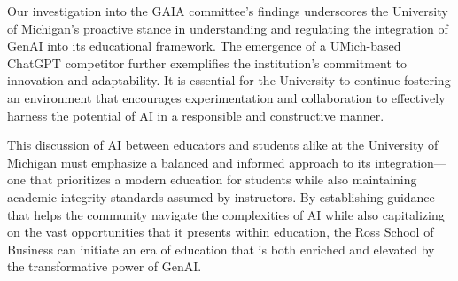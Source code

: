 \documentclass[
]{book}
\begin{document}
Our investigation into the GAIA committee's findings underscores the University of Michigan's proactive stance in understanding and regulating the integration of GenAI into its educational framework. The emergence of a UMich-based ChatGPT competitor further exemplifies the institution's commitment to innovation and adaptability. It is essential for the University to continue fostering an environment that encourages experimentation and collaboration to effectively harness the potential of AI in a responsible and constructive manner.

This discussion of AI between educators and students alike at the University of Michigan must emphasize a balanced and informed approach to its integration---one that prioritizes a modern education for students while also maintaining academic integrity standards assumed by instructors. By establishing guidance that helps the community navigate the complexities of AI while also capitalizing on the vast opportunities that it presents within education, the Ross School of Business can initiate an era of education that is both enriched and elevated by the transformative power of GenAI.

\hfill\break
\end{document}
